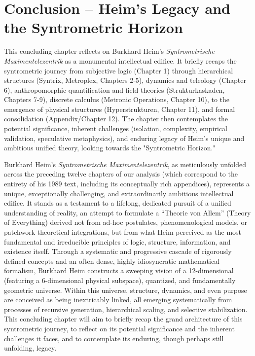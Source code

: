 \documentclass[
    12pt,              %
    a4paper,           %
    headings=normal,   %
    twoside=true,      %
    BCOR=8mm,          %
]{scrbook}
\begin{document}
\chapter{Conclusion – Heim’s Legacy and the Syntrometric Horizon}
\label{sec:conclusion}
This concluding chapter reflects on Burkhard Heim’s \textit{Syntrometrische Maximentelezentrik} as a monumental intellectual edifice. It briefly recaps the syntrometric journey from subjective logic (Chapter 1) through hierarchical structures (Syntrix, Metroplex, Chapters 2-5), dynamics and teleology (Chapter 6), anthropomorphic quantification and field theories (Strukturkaskaden, Chapters 7-9), discrete calculus (Metronic Operations, Chapter 10), to the emergence of physical structures (Hyperstrukturen, Chapter 11), and formal consolidation (Appendix/Chapter 12). The chapter then contemplates the potential significance, inherent challenges (isolation, complexity, empirical validation, speculative metaphysics), and enduring legacy of Heim's unique and ambitious unified theory, looking towards the "Syntrometric Horizon."

Burkhard Heim’s \textit{Syntrometrische Maximentelezentrik}, as meticulously unfolded across the preceding twelve chapters of our analysis (which correspond to the entirety of his 1989 text, including its conceptually rich appendices), represents a unique, exceptionally challenging, and extraordinarily ambitious intellectual edifice. It stands as a testament to a lifelong, dedicated pursuit of a unified understanding of reality, an attempt to formulate a \enquote{Theorie von Allem} (Theory of Everything) derived not from ad-hoc postulates, phenomenological models, or patchwork theoretical integrations, but from what Heim perceived as the most fundamental and irreducible principles of logic, structure, information, and existence itself. Through a systematic and progressive cascade of rigorously defined concepts and an often dense, highly idiosyncratic mathematical formalism, Burkhard Heim constructs a sweeping vision of a 12-dimensional (featuring a 6-dimensional physical subspace), quantized, and fundamentally geometric universe. Within this universe, structure, dynamics, and even purpose are conceived as being inextricably linked, all emerging systematically from processes of recursive generation, hierarchical scaling, and selective stabilization. This concluding chapter will aim to briefly recap the grand architecture of this syntrometric journey, to reflect on its potential significance and the inherent challenges it faces, and to contemplate its enduring, though perhaps still unfolding, legacy.
\end{document}
